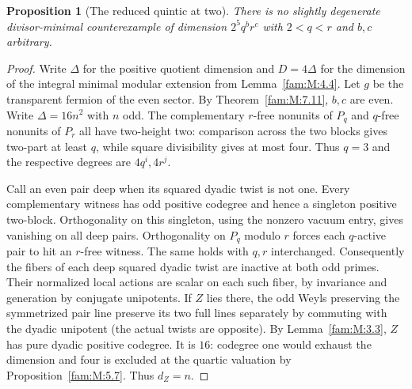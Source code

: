 \documentclass[11pt,a4paper]{article}
\numberwithin{equation}{section}
\newtheorem{proposition}[theorem]{Proposition}
\theoremstyle{remark}
\begin{document}
\begin{proposition}[The reduced quintic at two]\label{fam:Q:5.10}\label{fam:Q:n:q12:redfive}
There is no slightly degenerate divisor-minimal counterexample
of dimension $2^5q^br^c$ with $2<q<r$ and $b,c$ arbitrary.
\end{proposition}
\begin{proof}
Write $\Delta$ for the positive quotient dimension and
$D=4\Delta$ for the dimension of the integral minimal modular
extension from Lemma~\ref{fam:M:4.4}. Let $g$ be the transparent fermion of the even sector.
By Theorem~\ref{fam:M:7.11}, $b,c$ are even. Write $\Delta=16n^2$
with $n$ odd. The complementary $r$-free nonunits of $P_q$ and
$q$-free nonunits of $P_r$ all have two-height two: comparison across
the two blocks gives two-part at least $q$, while square divisibility
gives at most four. Thus $q=3$ and the respective degrees are
$4q^i,4r^j$.

Call an even pair deep when its squared dyadic twist is not one.
Every complementary witness has odd positive codegree and hence a
singleton positive two-block. Orthogonality on this singleton, using
the nonzero vacuum entry, gives vanishing on all deep pairs. Orthogonality on $P_q$ modulo $r$ forces each $q$-active pair
to hit an $r$-free witness. The same holds with $q,r$ interchanged.
Consequently the fibers of each deep squared dyadic twist are
inactive at both odd primes. Their normalized local actions are scalar on each such fiber, by
invariance and generation by conjugate unipotents.
If $Z$ lies there, the odd Weyls preserving the symmetrized pair line preserve
its two full lines separately by commuting with the dyadic
unipotent (the actual twists are opposite). By Lemma~\ref{fam:M:3.3}, $Z$
has pure dyadic positive codegree. It is $16$: codegree one would
exhaust the dimension and four is excluded at the quartic
valuation by Proposition~\ref{fam:M:5.7}. Thus $d_Z=n$.


\end{proof}
\end{document}
